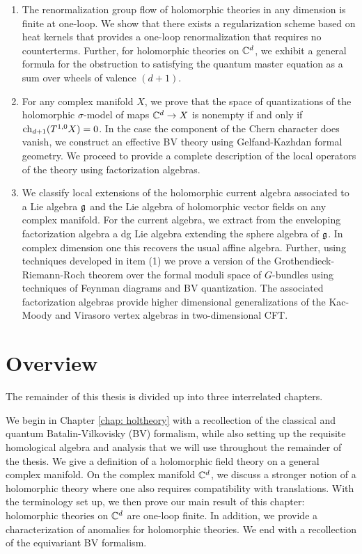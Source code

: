 \begin{enumerate}
\item The renormalization group flow of holomorphic theories in any dimension is finite at one-loop.
We show that there exists a regularization scheme based on heat kernels that provides a one-loop renormalization that requires no counterterms. 
Further, for holomorphic theories on $\mathbb C^d$, we exhibit a general formula for the obstruction to satisfying the quantum master equation as a sum over wheels of valence $(d+1)$. 

\item For any complex manifold $X$, we prove that the space of quantizations of the holomorphic $\sigma$-model of maps $\mathbb C^d \to X$ is nonempty if and only if ${\rm ch}_{d+1}(T^{1,0}X) = 0$. 
In the case the component of the Chern character does vanish, we construct an effective BV theory using Gelfand-Kazhdan formal geometry.
We proceed to provide a complete description of the local operators of the theory using factorization algebras.

\item We classify local extensions of the holomorphic current algebra associated to a Lie algebra $\mathfrak g$ and the Lie algebra of holomorphic vector fields on any complex manifold.
For the current algebra, we extract from the enveloping factorization algebra a dg Lie algebra extending the sphere algebra of $\mathfrak g$.
In complex dimension one this recovers the usual affine algebra.
Further, using techniques developed in item (1) we prove a version of the Grothendieck-Riemann-Roch theorem over the formal moduli space of $G$-bundles using techniques of Feynman diagrams and BV quantization.
The associated factorization algebras provide higher dimensional generalizations of the Kac-Moody and Virasoro vertex algebras in two-dimensional CFT. 

\end{enumerate}

\section{Overview}

The remainder of this thesis is divided up into three interrelated chapters. 

We begin in Chapter \ref{chap: holtheory} with a recollection of the classical and quantum Batalin-Vilkovisky (BV) formalism, while also setting up the requisite homological algebra and analysis that we will use throughout the remainder of the thesis. 
We give a definition of a holomorphic field theory on a general complex manifold. 
On the complex manifold $\mathbb C^d$, we discuss a stronger notion of a holomorphic theory where one also requires compatibility with translations. 
With the terminology set up, we then prove our main result of this chapter: holomorphic theories on $\mathbb C^d$ 
are one-loop finite.
In addition, we provide a characterization of anomalies for holomorphic theories. 
We end with a recollection of the equivariant BV formalism. 

